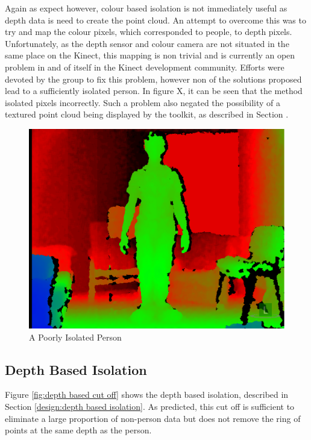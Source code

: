 Again as expect however, colour based isolation is not immediately useful as depth data is need to create the point cloud. An attempt to overcome this was to try and map the colour pixels, which corresponded to people, to depth pixels.
Unfortunately, as the depth sensor and colour camera are not situated in the same place on the Kinect, this mapping is non trivial and is currently an open problem in and of itself in the Kinect development community.
Efforts were devoted by the group to fix this problem, however non of the solutions proposed lead to a sufficiently isolated person.
In figure X, it can be seen that the method isolated pixels incorrectly. 
Such a problem also negated the possibility of a textured point cloud being displayed by the toolkit, as described in Section .

\begin{figure}[h]
\begin{center}
\includegraphics[scale=0.4]{./testing/parse1} 
\end{center}
\caption{A Poorly Isolated Person}
\label{fig:a poorly isolated person}
\end{figure} 

\subsection{Depth Based Isolation}
\label{testing:depth based isolation}
Figure \ref{fig:depth based cut off} shows the depth based isolation, described in Section \ref{design:depth based isolation}. As predicted, this cut off is sufficient to eliminate a large proportion of non-person data but does not remove the ring of points at the same depth as the person.\\

